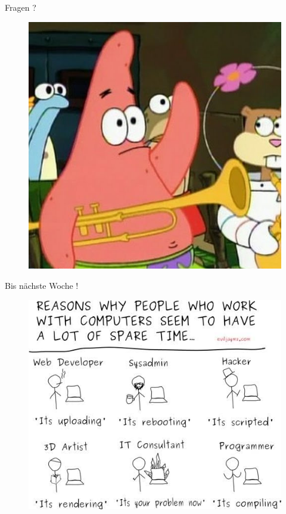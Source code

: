 \documentclass[18pt]{beamer}
\begin{document}
\begin{frame}{Fragen ?}
    \begin{figure}
        \includegraphics[scale=0.3]{img/fragen.jpg}
    \end{figure}
\end{frame}

\begin{frame}{Bis nächste Woche !}
    \begin{figure}
        \includegraphics[scale=0.4]{img/sparetime.jpg}
    \end{figure}
\end{frame}

\backupend
\end{document}
